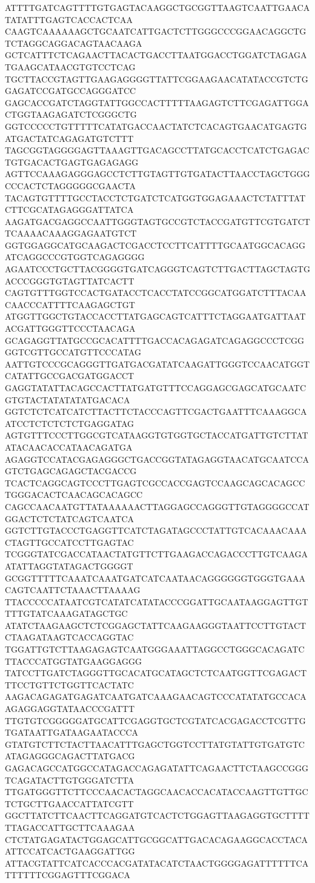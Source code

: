 ATTTTGATCAGTTTTGTGAGTACAAGGCTGCGGTTAAGTCAATTGAACATATATTTGAGTCACCACTCAA
CAAGTCAAAAAAGCTGCAATCATTGACTCTTGGGCCCGGAACAGGCTGTCTAGGCAGGACAGTAACAAGA
GCTCATTTCTCAGAACTTACACTGACCTTAATGGACCTGGATCTAGAGATGAAGCATAACGTGTCCTCAG
TGCTTACCGTAGTTGAAGAGGGGTTATTCGGAAGAACATATACCGTCTGGAGATCCGATGCCAGGGATCC
GAGCACCGATCTAGGTATTGGCCACTTTTTAAGAGTCTTCGAGATTGGACTGGTAAGAGATCTCGGGCTG
GGTCCCCCTGTTTTTCATATGACCAACTATCTCACAGTGAACATGAGTGATGACTATCAGAGATGTCTTT
TAGCGGTAGGGGAGTTAAAGTTGACAGCCTTATGCACCTCATCTGAGACTGTGACACTGAGTGAGAGAGG
AGTTCCAAAGAGGGAGCCTCTTGTAGTTGTGATACTTAACCTAGCTGGGCCCACTCTAGGGGGCGAACTA
TACAGTGTTTTGCCTACCTCTGATCTCATGGTGGAGAAACTCTATTTATCTTCGCATAGAGGGATTATCA
AAGATGACGAGGCCAATTGGGTAGTGCCGTCTACCGATGTTCGTGATCTTCAAAACAAAGGAGAATGTCT
GGTGGAGGCATGCAAGACTCGACCTCCTTCATTTTGCAATGGCACAGGATCAGGCCCGTGGTCAGAGGGG
AGAATCCCTGCTTACGGGGTGATCAGGGTCAGTCTTGACTTAGCTAGTGACCCGGGTGTAGTTATCACTT
CAGTGTTTGGTCCACTGATACCTCACCTATCCGGCATGGATCTTTACAACAACCCATTTTCAAGAGCTGT
ATGGTTGGCTGTACCACCTTATGAGCAGTCATTTCTAGGAATGATTAATACGATTGGGTTCCCTAACAGA
GCAGAGGTTATGCCGCACATTTTGACCACAGAGATCAGAGGCCCTCGGGGTCGTTGCCATGTTCCCATAG
AATTGTCCCGCAGGGTTGATGACGATATCAAGATTGGGTCCAACATGGTCATATTGCCGACGATGGACCT
GAGGTATATTACAGCCACTTATGATGTTTCCAGGAGCGAGCATGCAATCGTGTACTATATATATGACACA
GGTCTCTCATCATCTTACTTCTACCCAGTTCGACTGAATTTCAAAGGCAATCCTCTCTCTCTGAGGATAG
AGTGTTTCCCTTGGCGTCATAAGGTGTGGTGCTACCATGATTGTCTTATATACAACACCATAACAGATGA
AGAGGTCCATACGAGAGGGCTGACCGGTATAGAGGTAACATGCAATCCAGTCTGAGCAGAGCTACGACCG
TCACTCAGGCAGTCCCTTGAGTCGCCACCGAGTCCAAGCAGCACAGCCTGGGACACTCAACAGCACAGCC
CAGCCAACAATGTTATAAAAAACTTAGGAGCCAGGGTTGTAGGGGCCATGGACTCTCTATCAGTCAATCA
GGTCTTGTACCCTGAGGTTCATCTAGATAGCCCTATTGTCACAAACAAACTAGTTGCCATCCTTGAGTAC
TCGGGTATCGACCATAACTATGTTCTTGAAGACCAGACCCTTGTCAAGAATATTAGGTATAGACTGGGGT
GCGGTTTTTCAAATCAAATGATCATCAATAACAGGGGGGTGGGTGAAACAGTCAATTCTAAACTTAAAAG
TTACCCCCATAATCGTCATATCATATACCCGGATTGCAATAAGGAGTTGTTTTGTATCAAAGATAGCTGC
ATATCTAAGAAGCTCTCGGAGCTATTCAAGAAGGGTAATTCCTTGTACTCTAAGATAAGTCACCAGGTAC
TGGATTGTCTTAAGAGAGTCAATGGGAAATTAGGCCTGGGCACAGATCTTACCCATGGTATGAAGGAGGG
TATCCTTGATCTAGGGTTGCACATGCATAGCTCTCAATGGTTCGAGACTTTCCTGTTCTGGTTCACTATC
AAGACAGAGATGAGATCAATGATCAAAGAACAGTCCCATATATGCCACAAGAGGAGGTATAACCCGATTT
TTGTGTCGGGGGATGCATTCGAGGTGCTCGTATCACGAGACCTCGTTGTGATAATTGATAAGAATACCCA
GTATGTCTTCTACTTAACATTTGAGCTGGTCCTTATGTATTGTGATGTCATAGAGGGCAGACTTATGACG
GAGACAGCCATGGCCATAGACCAGAGATATTCAGAACTTCTAAGCCGGGTCAGATACTTGTGGGATCTTA
TTGATGGGTTCTTCCCAACACTAGGCAACACCACATACCAAGTTGTTGCTCTGCTTGAACCATTATCGTT
GGCTTATCTTCAACTTCAGGATGTCACTCTGGAGTTAAGAGGTGCTTTTTTAGACCATTGCTTCAAAGAA
CTCTATGAGATACTGGAGCATTGCGGCATTGACACAGAAGGCACCTACAATTCCATCACTGAAGGATTGG
ATTACGTATTCATCACCCACGATATACATCTAACTGGGGAGATTTTTTCATTTTTTCGGAGTTTCGGACA
